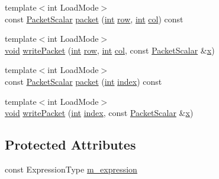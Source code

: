 \begin{DoxyCompactItemize}
\item 
{\footnotesize template$<$int Load\-Mode$>$ }\\const \hyperlink{class_matrix_base_a58f32cd6a06433ee7a60efa03e99183a}{Packet\-Scalar} \hyperlink{class_nest_by_value_a06159ce2f967e7de4cc2b77013c3bb94}{packet} (\hyperlink{ioapi_8h_a787fa3cf048117ba7123753c1e74fcd6}{int} \hyperlink{glext_8h_a11b277b422822f784ee248b43eee3e1e}{row}, \hyperlink{ioapi_8h_a787fa3cf048117ba7123753c1e74fcd6}{int} \hyperlink{class_matrix_base_ae3c94b0f25b4273c7a8125169bdf60e0}{col}) const 
\item 
{\footnotesize template$<$int Load\-Mode$>$ }\\\hyperlink{group___u_a_v_objects_plugin_ga444cf2ff3f0ecbe028adce838d373f5c}{void} \hyperlink{class_nest_by_value_ac3d009c54f9382b2e95ca0af41cf8760}{write\-Packet} (\hyperlink{ioapi_8h_a787fa3cf048117ba7123753c1e74fcd6}{int} \hyperlink{glext_8h_a11b277b422822f784ee248b43eee3e1e}{row}, \hyperlink{ioapi_8h_a787fa3cf048117ba7123753c1e74fcd6}{int} \hyperlink{class_matrix_base_ae3c94b0f25b4273c7a8125169bdf60e0}{col}, const \hyperlink{class_matrix_base_a58f32cd6a06433ee7a60efa03e99183a}{Packet\-Scalar} \&\hyperlink{glext_8h_a1db9d104e3c2128177f26aff7b46982f}{x})
\item 
{\footnotesize template$<$int Load\-Mode$>$ }\\const \hyperlink{class_matrix_base_a58f32cd6a06433ee7a60efa03e99183a}{Packet\-Scalar} \hyperlink{class_nest_by_value_a014bb11ae5965148fe9a72fac9110309}{packet} (\hyperlink{ioapi_8h_a787fa3cf048117ba7123753c1e74fcd6}{int} \hyperlink{glext_8h_ab47dd9958bcadea08866b42bf358e95e}{index}) const 
\item 
{\footnotesize template$<$int Load\-Mode$>$ }\\\hyperlink{group___u_a_v_objects_plugin_ga444cf2ff3f0ecbe028adce838d373f5c}{void} \hyperlink{class_nest_by_value_ac8ddfc0d49b4eea967407a359f3c0d3e}{write\-Packet} (\hyperlink{ioapi_8h_a787fa3cf048117ba7123753c1e74fcd6}{int} \hyperlink{glext_8h_ab47dd9958bcadea08866b42bf358e95e}{index}, const \hyperlink{class_matrix_base_a58f32cd6a06433ee7a60efa03e99183a}{Packet\-Scalar} \&\hyperlink{glext_8h_a1db9d104e3c2128177f26aff7b46982f}{x})
\end{DoxyCompactItemize}
\subsection*{Protected Attributes}
\begin{DoxyCompactItemize}
\item 
const Expression\-Type \hyperlink{class_nest_by_value_abededd28edf27665ef9e83b26d602a88}{m\-\_\-expression}
\end{DoxyCompactItemize}

